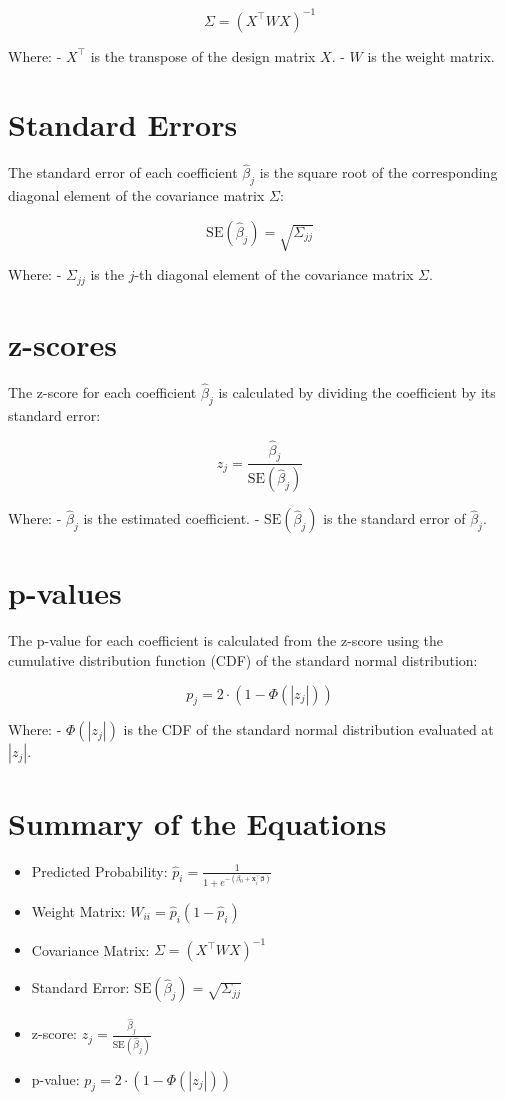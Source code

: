 \documentclass[10pt]{article}
\begin{document}
   \[
   \Sigma = (X^\top W X)^{-1}
   \]

   Where:
   - \( X^\top \) is the transpose of the design matrix \( X \).
   - \( W \) is the weight matrix.

\section*{Standard Errors}
   The standard error of each coefficient \( \hat{\beta}_j \) is the square root of the corresponding diagonal element of the covariance matrix \( \Sigma \):

   \[
   \text{SE}(\hat{\beta}_j) = \sqrt{\Sigma_{jj}}
   \]

   Where:
   - \( \Sigma_{jj} \) is the \( j \)-th diagonal element of the covariance matrix \( \Sigma \).

\section*{z-scores}
   The z-score for each coefficient \( \hat{\beta}_j \) is calculated by dividing the coefficient by its standard error:

   \[
   z_j = \frac{\hat{\beta}_j}{\text{SE}(\hat{\beta}_j)}
   \]

   Where:
   - \( \hat{\beta}_j \) is the estimated coefficient.
   - \( \text{SE}(\hat{\beta}_j) \) is the standard error of \( \hat{\beta}_j \).

\section*{p-values}
   The p-value for each coefficient is calculated from the z-score using the cumulative distribution function (CDF) of the standard normal distribution:

   \[
   p_j = 2 \cdot \left(1 - \Phi\left(\left|z_j\right|\right)\right)
   \]

   Where:
   - \( \Phi(\left|z_j\right|) \) is the CDF of the standard normal distribution evaluated at \( \left|z_j\right| \).

\section*{Summary of the Equations}
\begin{itemize}
  \item Predicted Probability: \( \hat{p}_i = \frac{1}{1 + e^{-(\beta_0 + \mathbf{x}_i^\top \boldsymbol{\beta})}} \)
  \item Weight Matrix: \( W_{ii} = \hat{p}_i (1 - \hat{p}_i) \)
  \item Covariance Matrix: \( \Sigma = (X^\top W X)^{-1} \)
  \item Standard Error: \( \text{SE}(\hat{\beta}_j) = \sqrt{\Sigma_{jj}} \)
  \item z-score: \( z_j = \frac{\hat{\beta}_j}{\text{SE}(\hat{\beta}_j)} \)
  \item p-value: \( p_j = 2 \cdot \left(1 - \Phi\left(\left|z_j\right|\right)\right) \)
\end{itemize}
\end{document}
